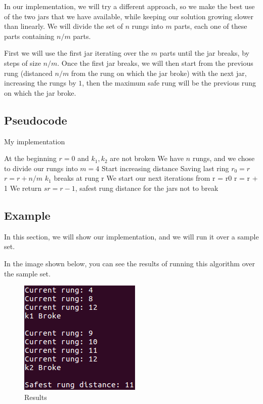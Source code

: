 \documentclass{article}
\begin{document}
In our implementation, we will try a different approach, so we make the best use of the two jars that we have available, while keeping our solution growing slower than linearly. We will divide the set of $n$ rungs into $m$ parts, each one of these parts containing $n/m$ parts.

First we will use the first jar iterating over the $m$ parts until the jar breaks, by steps of size $n/m$. Once the first jar breaks, we will then start from the previous rung (distanced $n/m$ from the rung on which the jar broke) with the next jar, increasing the rungs by $1$, then the maximum safe rung will be the previous rung on which the jar broke.
 
\subsection*{Pseudocode}

\begin{algorithm}[H]
\caption{My implementation}
\begin{algorithmic}[1]
\State At the beginning $r = 0$ and $k_1,k_2$ are not broken
\State We have $n$ rungs, and we chose to divide our rungs into $m = 4$
 \State Start increasing distance
 \State Saving last ring $r_0 = r$
 \State $r = r + n/m$
  \State $k_1$ breaks at rung r
 \EndIf
\EndWhile
\State We start our next iterations from r = r0
 \State r = r + 1
  \State We return $sr = r-1$, safest rung distance for the jars not to break
 \EndIf 
\EndWhile
\end{algorithmic}
\end{algorithm}

\subsection*{Example}

In this section, we will show our implementation, and we will run it over a sample set.



In the image shown below, you can see the results of running this algorithm over the sample set.

\begin{figure}[H]
\begin{center}
\includegraphics[scale=.8]{problem1a}
\end{center}
\caption{Results}
\end{figure}
\end{document}
